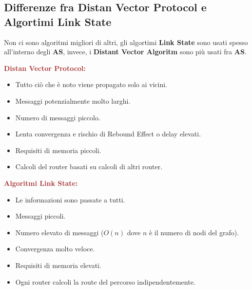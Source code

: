 \subsection{Differenze fra Distan Vector Protocol e Algortimi Link State}
Non ci sono algoritmi migliori di altri, gli algortimi \textbf{Link State} sono usati spesso all'interno degli \textbf{AS}, invece, i \textbf{Distant Vector Algoritm} sono più usati fra \textbf{AS}.
\begin{center}
    \begin{minipage}{.45\linewidth}
        \begin{boxDef}
        \textbf{\textcolor{brown}{Distan Vector Protocol:}}
            \begin{itemize}
                \item Tutto ciò che è noto viene propagato solo ai vicini.
                \item Messaggi potenzialmente molto larghi.
                \item Numero di messaggi piccolo.
                \item Lenta convergenza e rischio di Rebound Effect o delay elevati.
                \item Requisiti di memoria piccoli.
                \item Calcoli del router basati su calcoli di altri router.
            \end{itemize}
        \end{boxDef}
    \end{minipage}
    \begin{minipage}{.45\linewidth}
        \begin{boxDef}
        \textbf{\textcolor{brown}{Algoritmi Link State:}}
            \begin{itemize}
                \item Le informazioni sono passate a tutti.
                \item Messaggi piccoli.
                \item Numero elevato di messaggi ($O(n)$ dove $n$ è il numero di nodi del grafo).
                \item Convergenza molto veloce.
                \item Requisiti di memoria elevati.
                \item Ogni router calcoli la route del percorso indipendentemente.
            \end{itemize}
        \end{boxDef}
    \end{minipage}
\end{center}

